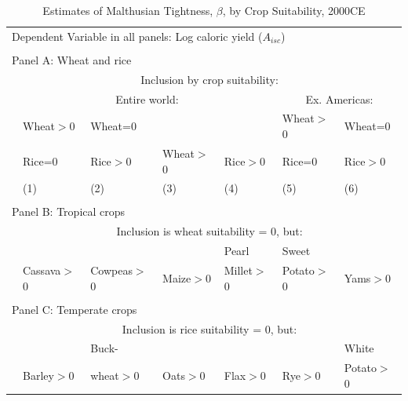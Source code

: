 \documentclass[11pt]{article}
\begin{document}
\clearpage


\begin{table}[!htb]
\begin{center}
\caption{Estimates of Malthusian Tightness, $\beta$, by Crop Suitability, 2000CE}
\label{TAB_beta_crops}
{\footnotesize
\begin{tabularx}{\textwidth}{lXXXXXX}
\midrule
\multicolumn{7}{l}{Dependent Variable in all panels: Log caloric yield ($A_{isc}$)} \\ \\
\multicolumn{7}{l}{Panel A: Wheat and rice} \\
 & \multicolumn{6}{c}{Inclusion by crop suitability:} \\ \cmidrule(lr){2-7}
 & \multicolumn{4}{c}{Entire world:} & \multicolumn{2}{c}{Ex. Americas:}\\ \cmidrule(lr){2-5} \cmidrule(lr){6-7} 
 & Wheat$>$0& Wheat=0 &         &        & Wheat$>$0   & Wheat=0   \\
 & Rice=0 & Rice$>$0  & Wheat$>$0 & Rice$>$0 & Rice=0    & Rice$>$0   \\
 & (1) & (2) & (3) & (4) & (5) & (6) \\
\midrule

\midrule
\\
\multicolumn{7}{l}{Panel B: Tropical crops} \\
                   & \multicolumn{6}{c}{Inclusion is wheat suitability = 0, but:} \\ \cmidrule(lr){2-7}
                   &            &              &          &   Pearl       &  Sweet      & \\
& Cassava$>$0 & Cowpeas$>$0  & Maize$>$0 & Millet$>$0 & Potato$>$0 & Yams$>$0   \\
\midrule

\midrule
\\
\multicolumn{7}{l}{Panel C: Temperate crops} \\
                   & \multicolumn{6}{c}{Inclusion is rice suitability = 0, but:} \\ \cmidrule(lr){2-7}
                   &            & Buck-        &          &          &         & White \\
                   & Barley$>$0 & wheat$>$0  & Oats$>$0 & Flax$>$0 & Rye$>$0 & Potato$>$0   \\
\midrule

\midrule
\end{tabularx}
}
\end{center}

\end{table}
\end{document}

